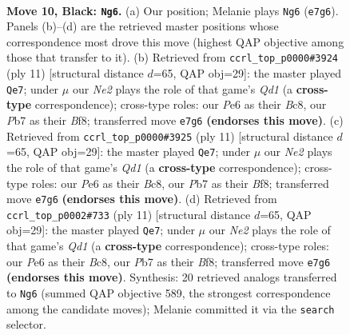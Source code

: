 \documentclass[11pt]{article}
\begin{document}
\clearpage

\begin{figure}[p]\centering
\begin{subfigure}{0.46\textwidth}\centering
\resizebox{\linewidth}{!}{%
\newchessgame
\chessboard[
  setfen={rnb1r1k1/pp1qnppp/4p3/2PpP3/5PPP/P1P5/2P5/R1BQKBNR b KQ - 0 10},
  showmover=false,
  pgfstyle=straightmove, color=movearrow, markmove={e7-g6}
]}
\caption{}
\end{subfigure}\hfill
\begin{subfigure}{0.46\textwidth}\centering
\resizebox{\linewidth}{!}{%
\newchessgame
\chessboard[
  setfen={r1bqkb1r/p1pp1ppp/2p2n2/4P3/8/8/PPP2PPP/RNBQKB1R b KQkq - 0 6},
  showmover=false,
  pgfstyle=straightmove, color=movearrow, markmove={d8-e7}
]}
\caption{}
\end{subfigure}
\\[4pt]
\begin{subfigure}{0.46\textwidth}\centering
\resizebox{\linewidth}{!}{%
\newchessgame
\chessboard[
  setfen={r1bqkb1r/p1pp1ppp/2p2n2/4P3/8/8/PPP2PPP/RNBQKB1R b KQkq - 0 6},
  showmover=false,
  pgfstyle=straightmove, color=movearrow, markmove={d8-e7}
]}
\caption{}
\end{subfigure}\hfill
\begin{subfigure}{0.46\textwidth}\centering
\resizebox{\linewidth}{!}{%
\newchessgame
\chessboard[
  setfen={r1bqkb1r/p1pp1ppp/2p2n2/4P3/8/8/PPP2PPP/RNBQKB1R b KQkq - 0 6},
  showmover=false,
  pgfstyle=straightmove, color=movearrow, markmove={d8-e7}
]}
\caption{}
\end{subfigure}
\caption{\textbf{Move 10, Black: \texttt{Ng6}.} (a) Our position; Melanie plays \texttt{Ng6} (\texttt{e7g6}). Panels (b)--(d) are the retrieved master positions whose correspondence most drove this move (highest QAP objective among those that transfer to it). (b) Retrieved from \texttt{ccrl\_top\_p0000\#3924} (ply 11) [structural distance $d$=65, QAP obj=29]: the master played \texttt{Qe7}; under $\mu$ our \emph{Ne2} plays the role of that game's \emph{Qd1} (a \textbf{cross-type} correspondence); cross-type roles: our \emph{P}e6 as their \emph{B}c8, our \emph{P}b7 as their \emph{B}f8; transferred move \texttt{e7g6} \textbf{(endorses this move)}. (c) Retrieved from \texttt{ccrl\_top\_p0000\#3925} (ply 11) [structural distance $d$=65, QAP obj=29]: the master played \texttt{Qe7}; under $\mu$ our \emph{Ne2} plays the role of that game's \emph{Qd1} (a \textbf{cross-type} correspondence); cross-type roles: our \emph{P}e6 as their \emph{B}c8, our \emph{P}b7 as their \emph{B}f8; transferred move \texttt{e7g6} \textbf{(endorses this move)}. (d) Retrieved from \texttt{ccrl\_top\_p0002\#733} (ply 11) [structural distance $d$=65, QAP obj=29]: the master played \texttt{Qe7}; under $\mu$ our \emph{Ne2} plays the role of that game's \emph{Qd1} (a \textbf{cross-type} correspondence); cross-type roles: our \emph{P}e6 as their \emph{B}c8, our \emph{P}b7 as their \emph{B}f8; transferred move \texttt{e7g6} \textbf{(endorses this move)}. Synthesis: 20 retrieved analogs transferred to \texttt{Ng6} (summed QAP objective 589, the strongest correspondence among the candidate moves); Melanie committed it via the \texttt{search} selector.}
\label{fig:thought-m19}
\end{figure}
\end{document}
